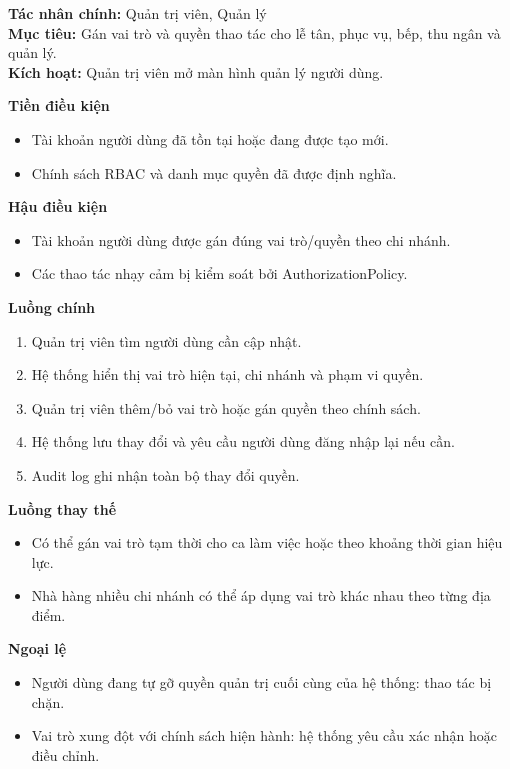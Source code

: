 \documentclass[11pt,a4paper]{article}
\begin{document}
    \begin{usecasebox}[title={UC-ADM-02 --- Quản lý vai trò và phân quyền}]
    \textbf{Tác nhân chính:} Quản trị viên, Quản lý\\
    \textbf{Mục tiêu:} Gán vai trò và quyền thao tác cho lễ tân, phục vụ, bếp, thu ngân và quản lý.\\
    \textbf{Kích hoạt:} Quản trị viên mở màn hình quản lý người dùng.

    \medskip
    \textbf{Tiền điều kiện}
    \begin{itemize}[leftmargin=1.8em]
  \item Tài khoản người dùng đã tồn tại hoặc đang được tạo mới.
  \item Chính sách RBAC và danh mục quyền đã được định nghĩa.
\end{itemize}

    \textbf{Hậu điều kiện}
    \begin{itemize}[leftmargin=1.8em]
  \item Tài khoản người dùng được gán đúng vai trò/quyền theo chi nhánh.
  \item Các thao tác nhạy cảm bị kiểm soát bởi \textsf{AuthorizationPolicy}.
\end{itemize}

    \textbf{Luồng chính}
    \begin{enumerate}[leftmargin=1.8em]
  \item Quản trị viên tìm người dùng cần cập nhật.
  \item Hệ thống hiển thị vai trò hiện tại, chi nhánh và phạm vi quyền.
  \item Quản trị viên thêm/bỏ vai trò hoặc gán quyền  theo chính sách.
  \item Hệ thống lưu thay đổi và yêu cầu người dùng đăng nhập lại nếu cần.
  \item Audit log ghi nhận toàn bộ thay đổi quyền.
\end{enumerate}

    \textbf{Luồng thay thế}
    \begin{itemize}[leftmargin=1.8em]
  \item Có thể gán vai trò tạm thời cho ca làm việc hoặc theo khoảng thời gian hiệu lực.
  \item Nhà hàng nhiều chi nhánh có thể áp dụng vai trò khác nhau theo từng địa điểm.
\end{itemize}

    \textbf{Ngoại lệ}
    \begin{itemize}[leftmargin=1.8em]
  \item Người dùng đang tự gỡ quyền quản trị cuối cùng của hệ thống: thao tác bị chặn.
  \item Vai trò xung đột với chính sách hiện hành: hệ thống yêu cầu xác nhận hoặc điều chỉnh.
\end{itemize}


\end{usecasebox}
\end{document}

